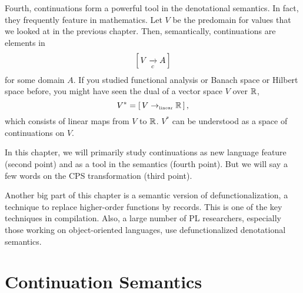\begin{enumcirc}
	Fourth, continuations form a powerful tool in the denotational semantics.
	In fact, they frequently feature in mathematics.
	Let $V$ be the predomain for values that we looked at in the previous chapter.
	Then, semantically, continuations are elements in
	\[
		\left[ \, V \xrightarrow[c]{} A \, \right]
	\]
	for some domain $A$.
	If you studied functional analysis or Banach space or Hilbert space before, you
	might have seen the dual of a vector space $V$ over $\mathbb{R}$,
	\[
		V^* = \left[ \, V \to_{\textrm{\tiny linear}} \mathbb{R} \, \right],
	\]
	which consists of linear maps from $V$ to $\mathbb{R}$.
	$V^*$ can be understood as a space of continuations on $V$.
	\item
	In this chapter, we will primarily study continuations as new language feature
	(second point) and as a tool in the semantics (fourth point).
	But we will say a few words on the CPS transformation (third point).
	\item
	Another big part of this chapter is a semantic version of defunctionalization,
	a technique to replace higher-order functions by records.
	This is one of the key techniques in compilation.
	Also, a large number of PL researchers, especially those working on
	object-oriented languages, use defunctionalized denotational semantics.
\end{enumcirc}

\section{Continuation Semantics}

